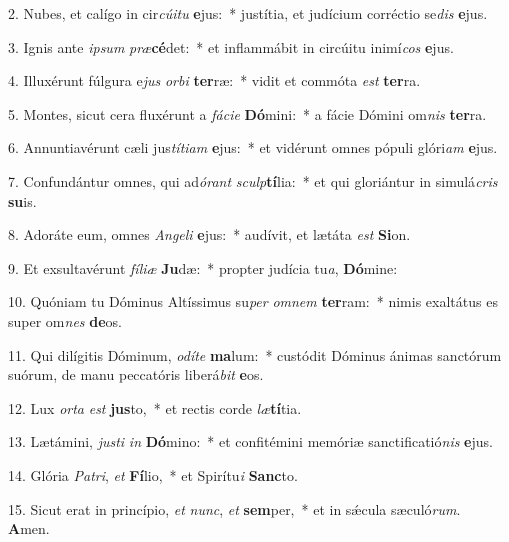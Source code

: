 2. Nubes, et calígo in cir\textit{cú}\textit{i}\textit{tu} \textbf{e}jus:~*  justítia, et judícium corréctio se\textit{dis} \textbf{e}jus.\

3. Ignis ante \textit{ip}\textit{sum} \textit{præ}\textbf{cé}det:~*  et inflammábit in circúitu inimí\textit{cos} \textbf{e}jus.\

4. Illuxérunt fúlgura e\textit{jus} \textit{or}\textit{bi} \textbf{ter}ræ:~*  vidit et commóta \textit{est} \textbf{ter}ra.\

5. Montes, sicut cera fluxérunt a \textit{fá}\textit{ci}\textit{e} \textbf{Dó}mini:~*  a fácie Dómini om\textit{nis} \textbf{ter}ra.\

6. Annuntiavérunt cæli jus\textit{tí}\textit{ti}\textit{am} \textbf{e}jus:~*  et vidérunt omnes pópuli glóri\textit{am} \textbf{e}jus.\

7. Confundántur omnes, qui ad\textit{ó}\textit{rant} \textit{sculp}\textbf{tí}lia:~*  et qui gloriántur in simulá\textit{cris} \textbf{su}is.\

8. Adoráte eum, omnes \textit{An}\textit{ge}\textit{li} \textbf{e}jus:~*  audívit, et lætáta \textit{est} \textbf{Si}on.\

9. Et exsultavérunt \textit{fí}\textit{li}\textit{æ} \textbf{Ju}dæ:~*  propter judícia tu\textit{a}, \textbf{Dó}mine:\

10. Quóniam tu Dóminus Altíssimus su\textit{per} \textit{om}\textit{nem} \textbf{ter}ram:~*  nimis exaltátus es super om\textit{nes} \textbf{de}os.\

11. Qui dilígitis Dóminum, \textit{o}\textit{dí}\textit{te} \textbf{ma}lum:~*  custódit Dóminus ánimas sanctórum suórum, de manu peccatóris liberá\textit{bit} \textbf{e}os.\

12. Lux \textit{or}\textit{ta} \textit{est} \textbf{jus}to,~*  et rectis corde \textit{læ}\textbf{tí}tia.\

13. Lætámini, \textit{jus}\textit{ti} \textit{in} \textbf{Dó}mino:~*  et confitémini memóriæ sanctificatió\textit{nis} \textbf{e}jus.\

14. Glória \textit{Pa}\textit{tri}, \textit{et} \textbf{Fí}lio,~*  et Spirítu\textit{i} \textbf{Sanc}to.\

15. Sicut erat in princípio, \textit{et} \textit{nunc}, \textit{et} \textbf{sem}per,~*  et in sǽcula sæculó\textit{rum}. \textbf{A}men.\

